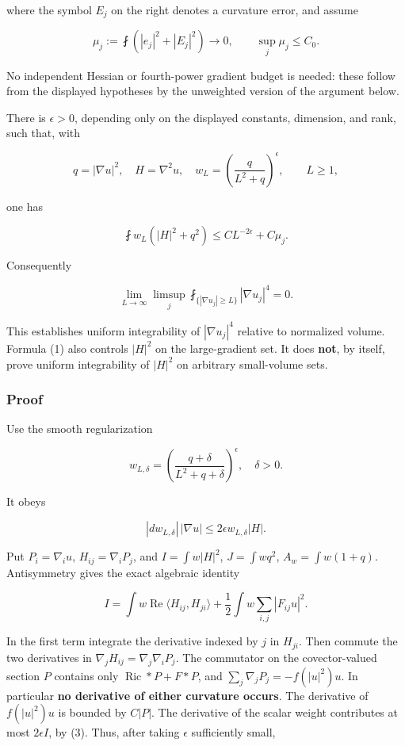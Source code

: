 \documentclass[11pt]{article}
\begin{document}
where the symbol \(E_j\) on the right denotes a curvature error, and
assume

\[
 \mu_j:=\fint(|e_j|^2+|E_j|^2)\longrightarrow0,
 \qquad \sup_j\mu_j\le C_0.
\]

No independent Hessian or fourth-power gradient budget is needed: these
follow from the displayed hypotheses by the unweighted version of the
argument below.

There is \(\epsilon>0\), depending only on the displayed constants,
dimension, and rank, such that, with

\[
 q=|\nabla u|^2,\quad H=\nabla^2u,\quad
 w_L=\left(\frac q{L^2+q}\right)^\epsilon,
 \qquad L\ge1,
\]

one has

\[
 \boxed{\fint w_L(|H|^2+q^2)
              \le C L^{-2\epsilon}+C\mu_j.}\tag{A.1}
\]

Consequently

\[
 \boxed{\lim_{L\to\infty}\limsup_j
       \fint_{\{|\nabla u_j|\ge L\}}|\nabla u_j|^4=0.}\tag{A.2}
\]

This establishes uniform integrability of \(|\nabla u_j|^4\) relative to
normalized volume. Formula (1) also controls \(|H|^2\) on the
large-gradient set. It does \textbf{not}, by itself, prove uniform
integrability of \(|H|^2\) on arbitrary small-volume sets.

\hypertarget{proof}{%
\subsubsection{Proof}\label{proof}}

Use the smooth regularization

\[
 w_{L,\delta}=\left(\frac{q+\delta}{L^2+q+\delta}\right)^\epsilon,
 \quad \delta>0.
\]

It obeys

\[
 |dw_{L,\delta}|\,|\nabla u|\le2\epsilon w_{L,\delta}|H|.
\tag{A.3}
\]

Put \(P_i=\nabla_i u\), \(H_{ij}=\nabla_iP_j\), and \(I=\int w|H|^2\),
\(J=\int wq^2\), \(A_w=\int w(1+q)\). Antisymmetry gives the exact
algebraic identity

\[
 I=\int w\operatorname{Re}\langle H_{ij},H_{ji}\rangle
       +\frac12\int w\sum_{i,j}|F_{ij}u|^2.
\tag{A.4}
\]

In the first term integrate the derivative indexed by \(j\) in
\(H_{ji}\). Then commute the two derivatives in
\(\nabla_jH_{ij}=\nabla_j\nabla_iP_j\). The commutator on the
covector-valued section \(P\) contains only
\(\operatorname{Ric}*P+F*P\), and \(\sum_j\nabla_jP_j=-f(|u|^2)u\). In
particular \textbf{no derivative of either curvature occurs}. The
derivative of \(f(|u|^2)u\) is bounded by \(C|P|\). The derivative of
the scalar weight contributes at most \(2\epsilon I\), by (3). Thus,
after taking \(\epsilon\) sufficiently small,
\end{document}

